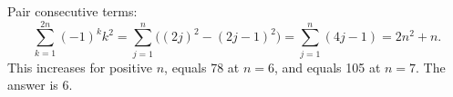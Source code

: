 Pair consecutive terms:
\[\sum_{k=1}^{2n}(-1)^k k^2=\sum_{j=1}^n\bigl((2j)^2-(2j-1)^2\bigr)=\sum_{j=1}^n(4j-1)=2n^2+n.\]
This increases for positive $n$, equals 78 at $n=6$, and equals 105 at $n=7$. The answer is $\boxed6$.
